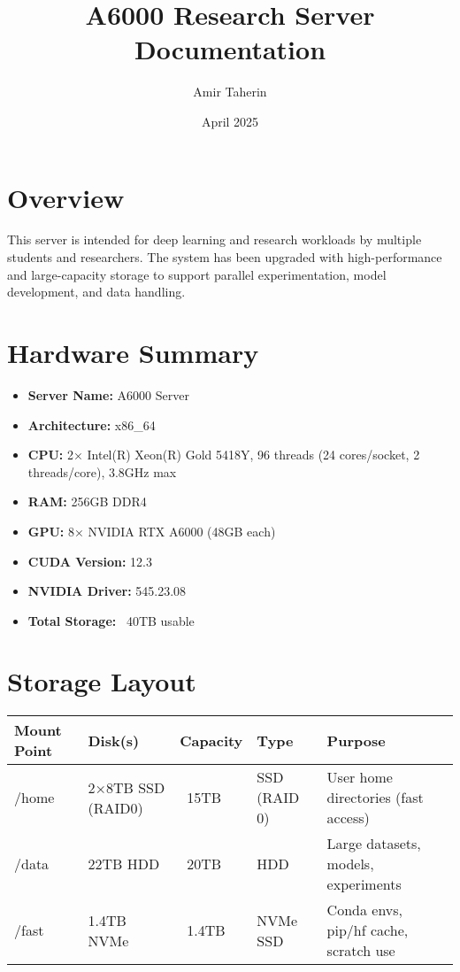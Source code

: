 \documentclass{article}
\title{A6000 Research Server Documentation}
\date{April 2025}
\author{Amir Taherin}
\begin{document}
\maketitle

\section*{Overview}
This server is intended for deep learning and research workloads by multiple students and researchers. The system has been upgraded with high-performance and large-capacity storage to support parallel experimentation, model development, and data handling.

\section*{Hardware Summary}
\begin{itemize}
  \item \textbf{Server Name:} A6000 Server
  \item \textbf{Architecture:} x86\_64
  \item \textbf{CPU:} 2× Intel(R) Xeon(R) Gold 5418Y, 96 threads (24 cores/socket, 2 threads/core), 3.8GHz max
  \item \textbf{RAM:} 256GB DDR4
  \item \textbf{GPU:} 8× NVIDIA RTX A6000 (48GB each)
  \item \textbf{CUDA Version:} 12.3
  \item \textbf{NVIDIA Driver:} 545.23.08
  \item \textbf{Total Storage:} ~40TB usable
\end{itemize}

\section*{Storage Layout}
\begin{longtable}{|l|l|l|l|p{6cm}|}
\hline
\textbf{Mount Point} & \textbf{Disk(s)} & \textbf{Capacity} & \textbf{Type} & \textbf{Purpose} \\
\hline
/home & 2×8TB SSD (RAID0) & ~15TB & SSD (RAID 0) & User home directories (fast access) \\
/data & 22TB HDD & ~20TB & HDD & Large datasets, models, experiments \\
/fast & 1.4TB NVMe & ~1.4TB & NVMe SSD & Conda envs, pip/hf cache, scratch use \\
\hline
\end{longtable}
\end{document}
